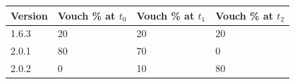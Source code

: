 \documentclass[]{article}
\makeatletter
\DeclareRobustCommand{\_}{%
  \leavevmode\vbox{%
    \hrule\@width.5em
          \@height-.26ex
          \@depth\dimexpr.26ex+.28pt\relax}}
\makeatother
\begin{document}
\begin{longtable}[]{@{}llll@{}}
\toprule
\begin{minipage}[t]{0.22\columnwidth}\raggedright\strut
{Version}\strut
\end{minipage} & \begin{minipage}[t]{0.22\columnwidth}\raggedright\strut
{Vouch \% at $t_0$}\strut
\end{minipage} & \begin{minipage}[t]{0.22\columnwidth}\raggedright\strut
{Vouch \% at $t_1$}\strut
\end{minipage} & \begin{minipage}[t]{0.22\columnwidth}\raggedright\strut
{Vouch \% at $t_2$}\strut
\end{minipage}\tabularnewline \midrule
\begin{minipage}[t]{0.22\columnwidth}\raggedright\strut
{1.6.3}\strut
\end{minipage} & \begin{minipage}[t]{0.22\columnwidth}\raggedright\strut
{20}\strut
\end{minipage} & \begin{minipage}[t]{0.22\columnwidth}\raggedright\strut
{20}\strut
\end{minipage} & \begin{minipage}[t]{0.22\columnwidth}\raggedright\strut
{20}\strut
\end{minipage}\tabularnewline
\begin{minipage}[t]{0.22\columnwidth}\raggedright\strut
{2.0.1}\strut
\end{minipage} & \begin{minipage}[t]{0.22\columnwidth}\raggedright\strut
{80}\strut
\end{minipage} & \begin{minipage}[t]{0.22\columnwidth}\raggedright\strut
{70}\strut
\end{minipage} & \begin{minipage}[t]{0.22\columnwidth}\raggedright\strut
{0}\strut
\end{minipage}\tabularnewline
\begin{minipage}[t]{0.22\columnwidth}\raggedright\strut
{2.0.2}\strut
\end{minipage} & \begin{minipage}[t]{0.22\columnwidth}\raggedright\strut
{0}\strut
\end{minipage} & \begin{minipage}[t]{0.22\columnwidth}\raggedright\strut
{10}\strut
\end{minipage} & \begin{minipage}[t]{0.22\columnwidth}\raggedright\strut
{80}\strut
\end{minipage}\tabularnewline
\bottomrule
\end{longtable}
\end{document}
